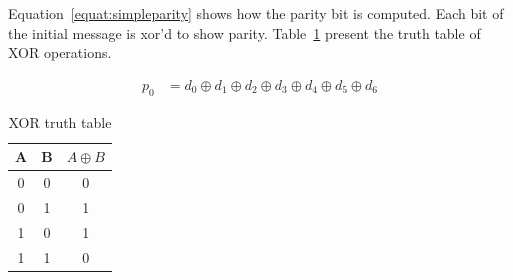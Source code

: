 Equation~\ref{equat:simpleparity} shows how the parity bit is computed. Each bit of the initial message is xor'd to show parity. Table~\ref{tab:xor_truthtable} present the truth table of XOR operations.

\begin{equation} \label{equat:simpleparity}
    \begin{split}
        p_{0} &= d_{0} \oplus d_{1} \oplus d_{2} \oplus d_{3} \oplus d_{4} \oplus d_{5} \oplus d_{6}
    \end{split}
\end{equation}

\begin{table}[t]
    \centering
    \caption{XOR truth table}
    \label{tab:xor_truthtable}
    \begin{tabular}{@{}c|c|c@{}}
        \toprule
        A & B & $A \oplus B$ \\\midrule
        0 & 0 & 0            \\
        0 & 1 & 1            \\
        1 & 0 & 1            \\
        1 & 1 & 0            \\
        \bottomrule
    \end{tabular}
\end{table}

